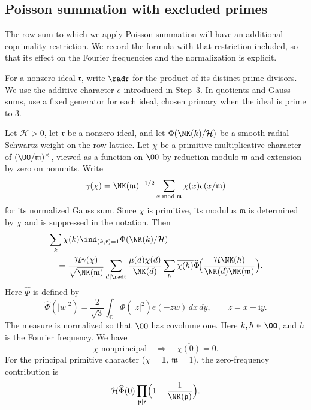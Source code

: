 \subsection{Poisson summation with excluded primes}
The row sum to which we apply Poisson summation will have an
additional coprimality restriction. We record the formula with that
restriction included, so that its effect on the Fourier frequencies
and the normalization is explicit.

For a nonzero ideal $\mathfrak r$, write $\rad \mathfrak r$ for the product of
its distinct prime divisors. We use the additive character $e$
introduced in Step~3. In quotients and Gauss sums, use a fixed
generator for each ideal, chosen primary when the ideal is prime to $3$.

\begin{lemma}\label{lem:poisson}
Let $\mathcal H>0$, let $\mathfrak r$ be a nonzero ideal, and let
$\Phi(\NK(k)/\mathcal H)$ be a smooth radial Schwartz weight
on the row lattice. Let $\chi$ be a primitive multiplicative character
of $(\OO/\mathfrak m)^\times$, viewed as a function on $\OO$ by
reduction modulo $\mathfrak m$ and extension by zero on nonunits.
Write 
\[
\gamma(\chi)=\NK(\mathfrak m)^{-1/2}
\sum_{x\bmod\mathfrak m}\chi(x)e(x/\mathfrak m)
\]
for its normalized Gauss sum.
Since $\chi$ is primitive, its modulus $\mathfrak m$ is determined by $\chi$ and is suppressed in the notation. Then
\begin{equation}\label{eq:poisson}
 \begin{aligned}
 &\sum_k\chi(k)\ind_{(k,\mathfrak r)=1}\Phi(\NK(k)/\mathcal{H})\\
 &\quad=\frac{\mathcal{H}\gamma(\chi)}{\sqrt{\NK(\mathfrak m)}}
   \sum_{d\mid\rad \mathfrak r}\frac{\mu(d)\chi(d)}{\NK(d)}
   \sum_h\overline{\chi(h)}
        \widehat\Phi\!\Bigl(\frac{\mathcal{H}\NK(h)}{\NK(d)\NK(\mathfrak m)}\Bigr).
 \end{aligned}
\end{equation}
Here $\widehat\Phi$ is defined by
\[
 \widehat\Phi(|w|^2)=\frac2{\sqrt3}\int_{\mathbb C}
       \Phi(|z|^2)e(-zw)\,dx\,dy,\qquad z=x+\mathrm i y.
\]
The measure is normalized so that $\OO$ has covolume one.
Here $k,h\in\OO$, and $h$ is the Fourier frequency. We have
\[
 \chi\text{ nonprincipal}\quad\Longrightarrow\quad
 \overline{\chi(0)}=0.
\]
For the principal primitive character ($\chi=\mathbf1$, $\mathfrak m=1$),
the zero-frequency contribution is
\[
 \mathcal H\widehat\Phi(0)
   \prod_{\mathfrak p\mid \mathfrak r}\Bigl(1-\frac1{\NK(\mathfrak p)}\Bigr).
\]
\end{lemma}

